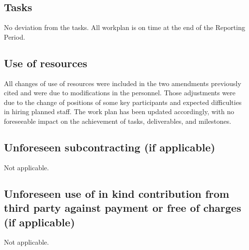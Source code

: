 \documentclass{deliverablereport}
\begin{document}
  \subsection{Tasks}

No deviation from the tasks. All workplan is on time at the end of the Reporting Period.

  \subsection{Use of resources}

All changes of use of resources were included in the two amendments previously cited and were
due to modifications in the personnel. Those adjustments were due to the change of positions
of some key \ODK participants and expected difficulties in hiring planned
staff. The work plan has been updated accordingly, with no foreseeable
impact on the achievement of tasks, deliverables, and milestones.

  \subsection{Unforeseen subcontracting (if applicable)}

Not applicable.

  \subsection{Unforeseen use of in kind contribution from third party against payment or
    free of charges (if applicable)}

 Not applicable. 

\newpage
\printbibliography
\end{document}
